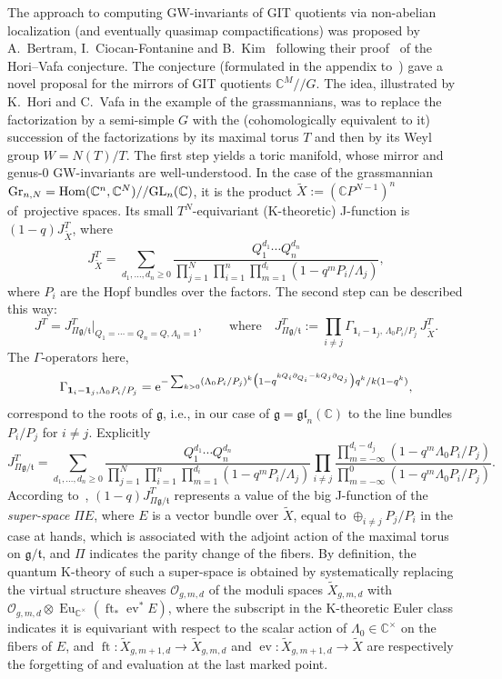 \documentclass[pdftex]{sigma}
\numberwithin{equation}{section}
\def\O{\mathcal O}
\def\1{\mathbf 1}
\def\CC{\mathbb C}
\def\tilde{\widetilde}
\def\p{\partial}
\def\ev{\operatorname{ev}}
\def\ft{\operatorname{ft}}
\def\Eu{\operatorname{Eu}}
\begin{document}
The approach to computing GW-invariants of GIT quotients via non-abelian localization (and eventually quasimap compactifications) was proposed by A.~Bertram, I.~Ciocan-Fontanine and B.~Kim~\cite{BCK2} following their proof~\cite{BCK1} of the Hori--Vafa conjecture. The conjecture (formulated in the appendix to~\cite{Hori-Vafa}) gave a novel proposal for the mirrors of GIT quotients $\CC^M//G$. The idea,
illustrated by K.~Hori and C.~Vafa in the example of the grassmannians, was to replace the factorization by a semi-simple $G$ with the (cohomologically equivalent to it) succession of the factorizations by its maximal torus $T$ and then by its Weyl group $W=N(T)/T$. The first step yields a toric manifold, whose mirror and genus-$0$ GW-invariants are well-understood. In the case of the grassmannian ${\rm Gr}_{n,N}=\mathop{\rm Hom}(\CC^n,\CC^N)//{\rm GL}_n(\CC)$, it is the product $\tilde{X}:=(\CC P^{N-1})^n$ of~projective spaces. Its small $T^N$-equivariant (K-theoretic) J-function is $(1-q) J_{\tilde{X}}^T$, where
\[
J^T_{\tilde{X}}=\sum_{d_1,\dots,d_n\geq 0}\frac{Q_1^{d_1}\cdots Q_n^{d_n}}{\prod_{j=1}^N\prod_{i=1}^n\prod_{m=1}^{d_i}(1-q^mP_i/\Lambda_j)},
\]
where $P_i$ are the Hopf bundles over the factors. The second step can be described this way:
\[
J^T=J^T_{\Pi \mathfrak{g}/\mathfrak{t}}|_{Q_1=\cdots=Q_n=Q, \Lambda_0=1}, \qquad \text{where}\quad J^T_{\Pi \mathfrak{g}/\mathfrak{t}}:=\prod_{i\neq j} \Gamma_{\1_i-\1_j,\,\Lambda_0 P_i/P_j} \,J^T_{\tilde{X}}.
\]
The $\Gamma$-operators here,
\[
\Gamma_{\1_i-\1_j, \Lambda_0 P_i/P_j}={\rm e}^{ -\sum_{k>0} (\Lambda_0P_i/P_j)^k\big(1-q^{kQ_i\p_{Q_i}-kQ_j\p_{Q_j}}\big)q^k/k(1-q^k)},
\]
correspond to the roots of $\mathfrak{g}$, i.e., in our case of $\mathfrak{g}=\mathfrak{gl}_n(\CC)$ to the line bundles $P_i/P_j$ for $i\neq j$. Explicitly
\[
J^T_{\Pi \mathfrak{g}/\mathfrak{t}}=\sum_{d_1,\dots,d_n\geq 0}\frac{Q_1^{d_1}\cdots Q_n^{d_n}}{\prod_{j=1}^N\prod_{i=1}^n\prod_{m=1}^{d_i}(1-q^mP_i/\Lambda_j)}
\prod_{i\neq j}\frac{\prod_{m=-\infty}^{d_i-d_j}(1-q^m\Lambda_0P_i/P_j)}{\prod_{m=-\infty}^0
(1-q^m\Lambda_0P_i/P_j)}.
\]
According to~\cite{Givental:perm5}, $(1-q)J^T_{\Pi {\mathfrak{g}/\mathfrak{t}}}$ represents a value of the big J-function of the {\em super-space} $\Pi E$, where $E$ is a vector bundle over $\tilde{X}$, equal to $\oplus_{i\neq j}P_j/P_i$ in the case at hands, which is associated with the adjoint action of the maximal torus on $\mathfrak{g}/\mathfrak{t}$, and $\Pi$ indicates the parity change of the fibers. By definition, the quantum K-theory of such a super-space is obtained by systematically replacing the virtual structure sheaves $\O_{g,m,d}$ of the moduli spaces $\tilde{X}_{g,m,d}$ with $\O_{g,m,d}\otimes \Eu_{\CC^{\times}}(\ft_*\ev^*E)$, where the subscript in the K-theoretic Euler class indicates it is equi\-variant with respect to the scalar action of $\Lambda_0\in \CC^{\times}$ on the fibers of $E$, and $\ft\colon \tilde{X}_{g,m+1,d}\to \tilde{X}_{g,m,d}$ and $\ev\colon \tilde{X}_{g,m+1,d}\to \tilde{X}$ are respectively the forgetting of and evaluation at the last marked point.
\end{document}

